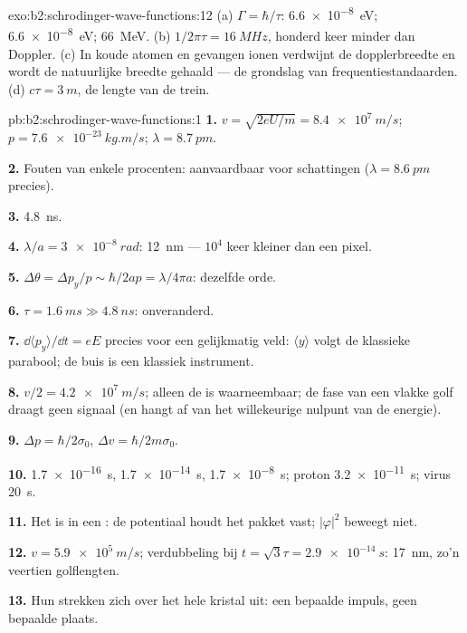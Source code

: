 \begin{solution}{exo:b2:schrodinger-wave-functions:12}
(a) $\Gamma = \hbar/\tau$: \qty{6.6e-8}{eV}; \qty{6.6e-8}{eV}; \qty{66}{MeV}. (b)
$1/2\pi\tau = \qty{16}{MHz}$, honderd keer minder dan Doppler. (c) In
koude atomen en gevangen ionen verdwijnt de dopplerbreedte en wordt de natuurlijke
breedte gehaald --- de grondslag van frequentiestandaarden. (d)
$c\tau =
\qty{3}{m}$, de lengte van de trein.
\end{solution}

\begin{solution}{pb:b2:schrodinger-wave-functions:1}
\textbf{1.} $v = \sqrt{2eU/m} = \qty{8.4e7}{m/s}$;
$p = \qty{7.6e-23}{kg.m/s}$; $\lambda =
\qty{8.7}{pm}$.

\textbf{2.} Fouten van enkele procenten: aanvaardbaar voor schattingen
($\lambda =
\qty{8.6}{pm}$ precies).

\textbf{3.} \qty{4.8}{ns}.

\textbf{4.} $\lambda/a = \qty{3e-8}{rad}$: \qty{12}{nm} --- $10^4$ keer
kleiner dan een
pixel.

\textbf{5.} $\Delta\theta = \Delta p_y/p \sim \hbar/2ap = \lambda/4\pi a$:
dezelfde orde.

\textbf{6.} $\tau = \qty{1.6}{ms} \gg \qty{4.8}{ns}$: onveranderd.

\textbf{7.} $\dd\langle p_y\rangle/\dd t = eE$ precies voor een gelijkmatig veld:
$\langle y\rangle$ volgt de klassieke parabool; de buis is een
klassiek instrument.

\textbf{8.} $v/2 = \qty{4.2e7}{m/s}$; alleen de  is waarneembaar;
de fase van een vlakke golf draagt geen signaal (en hangt af van het willekeurige
nulpunt van de energie).

\textbf{9.} $\Delta p = \hbar/2\sigma_0$, $\Delta v = \hbar/2m\sigma_0$.

\textbf{10.} \qty{1.7e-16}{s}, \qty{1.7e-14}{s}, \qty{1.7e-8}{s}; proton
\qty{3.2e-11}{s};
virus \qty{20}{s}.

\textbf{11.} Het is in een : de potentiaal houdt het
pakket vast; $|\varphi|^2$ beweegt niet.

\textbf{12.} $v = \qty{5.9e5}{m/s}$; verdubbeling bij
$t = \sqrt3\tau = \qty{2.9e-14}{s}$:
\qty{17}{nm}, zo'n veertien golflengten.

\textbf{13.} Hun  strekken zich over het hele kristal uit: een
bepaalde impuls, geen bepaalde plaats.


\end{solution}
